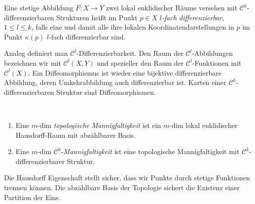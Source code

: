 \begin{definition}
\begin{mdframed}
Eine stetige Abbildung $F:X \to Y$ zwei lokal euklidischer Räume versehen mit $\mathcal{C}^k$-differenzierbaren Strukturen heißt im Punkt $p\in X$ \emph{$l$-fach differenzierbar}, $1\leq l \leq k$, falls eine und damit alle ihre lokalen Koordinatendarstellungen in $p$ im Punkt $\kappa(p)$ $l$-fach differenzierbar sind.
\end{mdframed}
\end{definition}
Analog definiert man $\mathcal{C}^l$-Differenzierbarkeit. Den Raum der $\mathcal{C}^l$-Abbildungen bezeichnen wir mit $\mathcal{C}^l(X,Y)$ und spezieller den Raum der $\mathcal{C}^l$-Funktionen mit $\mathcal{C}^l(X)$. Ein Diffeomorphismus ist wieder eine bijektive differenzierbare Abbildung, deren Umkehrabbildung auch differenzierbar ist. Karten einer $\mathcal{C}^k$-differenzierbaren Struktur sind Diffeomorphismen.

\begin{definition}
\begin{mdframed}\
\begin{enumerate}[topsep=0.2pc]
	\item Eine $m$-dim \emph{topologische Mannigfaltigkeit} ist ein $m$-dim lokal euklidischer Hausdorff-Raum mit abzählbarer Basis.
	\item Eine $m$-dim $\mathcal{C}^k$-\emph{Mannigfaltigkeit} ist eine topologische Mannigfaltigkeit mit $\mathcal{C}^k$-differenzierbarer Struktur.
\end{enumerate}
\end{mdframed}
\end{definition}
Die Hausdorff Eigenschaft stellt sicher, dass wir Punkte durch stetige Funktionen trennen können. Die abzählbare Basis der Topologie sichert die Existenz einer Partition der Eins.


